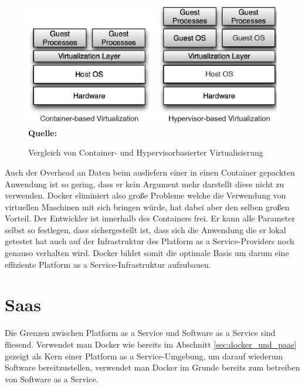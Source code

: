 \begin{figure}[htbp]
  \centering  
  \includegraphics[scale=0.5]{img/abstractionContainerHyper.JPG}\\
  \footnotesize\sffamily\textbf{Quelle:} \cite{miguel_g._xavier_performance_????}
  \caption{Vergleich von Container- und Hypervisorbasierter Virtualisierung }
  \label{fig:abstraction_container_hyper}
\end{figure}
Auch der Overhead an Daten beim ausliefern einer in einen Container gepackten Anwendung ist so gering, dass er kein Argument mehr darstellt diese nicht zu verwenden.
Docker eliminiert also große Probleme welche die Verwendung von virtuellen Maschinen mit sich bringen würde, hat dabei aber den selben großen Vorteil.
Der Entwickler ist innerhalb des Containers frei. Er kann alle Parameter selbst so festlegen, dass sichergestellt ist, dass sich die Anwendung die er lokal getestet hat auch auf der Infrastruktur des Platform as a Service-Providers noch genauso verhalten wird. 
Docker bildet somit die optimale Basis um darum eine effiziente Platform as a Service-Infrastruktur aufzubauen. 

\section{Saas}
\label{sec:saas}
Die Grenzen zwischen Platform as a Service und Software as a Service sind fliesend.
Verwendet man Docker wie bereits im Abschnitt \ref{sec:docker_und_paas} gezeigt als Kern einer Platform as a Service-Umgebung, um darauf wiederum Software bereitzustellen, verwendet man Docker im Grunde bereits zum betreiben von Software as a Service.

